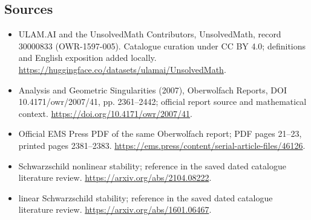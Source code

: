 \documentclass[11pt]{article}
\begin{document}
\subsection{Sources}
\begin{itemize}
\item[\hypertarget{source:30000833:1}{S1}] ULAM.AI and the UnsolvedMath Contributors, UnsolvedMath, record 30000833 (OWR-1597-005). Catalogue curation under CC BY 4.0; definitions and English exposition added locally.
\url{https://huggingface.co/datasets/ulamai/UnsolvedMath}.
\item[\hypertarget{source:30000833:2}{S2}] Analysis and Geometric Singularities (2007), Oberwolfach Reports, DOI 10.4171/owr/2007/41, pp. 2361--2442; official report source and mathematical context.
\url{https://doi.org/10.4171/owr/2007/41}.
\item[\hypertarget{source:30000833:3}{S3}] Official EMS Press PDF of the same Oberwolfach report; PDF pages 21--23, printed pages 2381--2383.
\url{https://ems.press/content/serial-article-files/46126}.
\item[\hypertarget{source:30000833:4}{S4}] Schwarzschild nonlinear stability; reference in the saved dated catalogue literature review.
\url{https://arxiv.org/abs/2104.08222}.
\item[\hypertarget{source:30000833:5}{S5}] linear Schwarzschild stability; reference in the saved dated catalogue literature review.
\url{https://arxiv.org/abs/1601.06467}.
\end{itemize}
\label{end:30000833}
\end{document}
